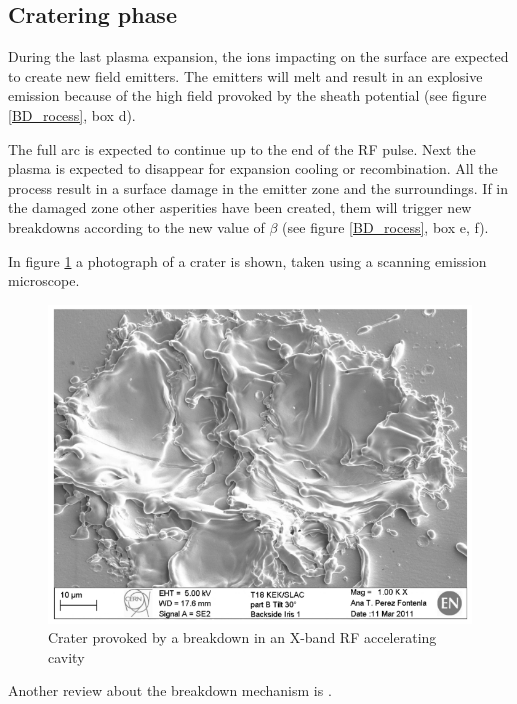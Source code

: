 \subsection[Cratering phase]{Cratering phase}

During the last plasma expansion, the ions impacting on the surface are expected to create new field emitters. The emitters will melt and result in an explosive emission because of the high field provoked by the sheath potential (see figure \ref{BD_rocess}, box d). 

The full arc is expected to continue up to the end of the RF pulse. Next the plasma is expected to disappear for expansion cooling or recombination. All the process result in a surface damage in the emitter zone and the surroundings. If in the damaged zone other asperities have been created, them will trigger new breakdowns according to the new value of $\beta$ (see figure \ref{BD_rocess}, box e, f). 

In figure \ref{SEM_crater} a photograph of a crater is shown, taken using a scanning emission microscope.
\begin{figure}[h]
\centering
\includegraphics[scale=0.4]{pictures/crater}
\caption{Crater provoked by a breakdown in an X-band RF accelerating cavity \cite{Wuensch:advaces}}
\label{SEM_crater}
\end{figure}
Another review about the breakdown mechanism is \cite{soviet:1983}.




